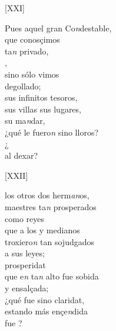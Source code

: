 \documentclass[11pt,a4paper,twoside]{article}
\begin{document}
{\begin{center}
	[XXI]
\end{center}
\pstart
Pues aquel gran Co\textit{n}destable,\\
 que conosçimos\\
ta\textit{n} privado,\\
 ,\\
sino sólo  vimos\\
degollado;\\
sus infinitos tesoros,\\
sus villas  sus lugares,\\
su ma\textit{n}dar,\\
¿qué le fuero\textit{n} sino lloros?\\
¿\\
al dexar?
\pend

\begin{center}
	[XXII]
\end{center}
\pstart
{} los otros dos herm\textit{an}os,\\
maestres ta\textit{n} prosperados\\
como reyes\\
que a los  y medianos\\
troxiero\textit{n} tan sojudgados\\
a sus leyes;\\
 prosperidat\\
que e\textit{n} ta\textit{n} alto fue sobida\\
y ensalçada;\\
¿qué fue sino claridat,\\
 estando más ençe\textit{n}dida\\
fue ?
\pend

}
\end{document}
